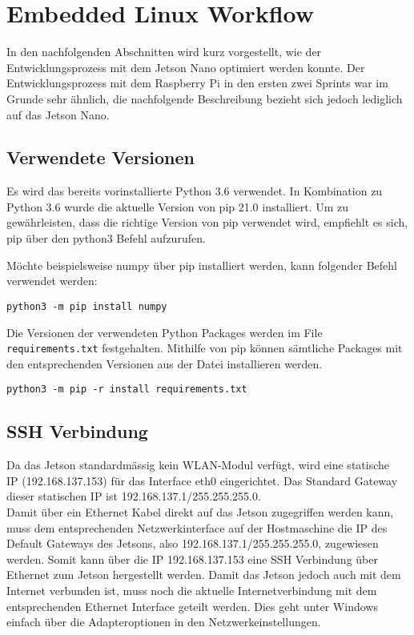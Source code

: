 \newpage

\section{Embedded Linux Workflow}
In den nachfolgenden Abschnitten wird kurz vorgestellt, wie der Entwicklungsprozess mit dem Jetson Nano optimiert werden konnte. Der Entwicklungsprozess mit dem Raspberry Pi in den ersten zwei Sprints war im Grunde sehr ähnlich, die nachfolgende Beschreibung bezieht sich jedoch lediglich auf das Jetson Nano.

\subsection{Verwendete Versionen}
Es wird das bereits vorinstallierte Python 3.6 verwendet. In Kombination zu Python 3.6 wurde die aktuelle Version von pip 21.0 installiert. Um zu gewährleisten, dass die richtige Version von pip verwendet wird, empfiehlt es sich, pip über den python3 Befehl aufzurufen.

Möchte beispielsweise numpy über pip installiert werden, kann folgender Befehl verwendet werden:
\begin{verbatim}
python3 -m pip install numpy
\end{verbatim}

Die Versionen der verwendeten Python Packages werden im File \texttt{requirements.txt} festgehalten. Mithilfe von pip können sämtliche Packages mit den entsprechenden Versionen aus der Datei installieren werden.

\begin{verbatim}
python3 -m pip -r install requirements.txt
\end{verbatim}

\subsection{SSH Verbindung}
Da das Jetson standardmässig kein WLAN-Modul verfügt, wird eine statische \\ IP (192.168.137.153) für das Interface eth0 eingerichtet. Das Standard Gateway dieser statischen IP ist 192.168.137.1/255.255.255.0. \\ Damit über ein Ethernet Kabel direkt auf das Jetson zugegriffen werden kann, muss dem entsprechenden Netzwerkinterface auf der Hostmaschine die IP des Default Gateways des Jetsons, also 192.168.137.1/255.255.255.0, zugewiesen werden. Somit kann über die IP 192.168.137.153 eine SSH Verbindung über Ethernet zum Jetson hergestellt werden. Damit das Jetson jedoch auch mit dem Internet verbunden ist, muss noch die aktuelle Internetverbindung mit dem entsprechenden Ethernet Interface geteilt werden. Dies geht unter Windows einfach über die Adapteroptionen in den Netzwerkeinstellungen.

